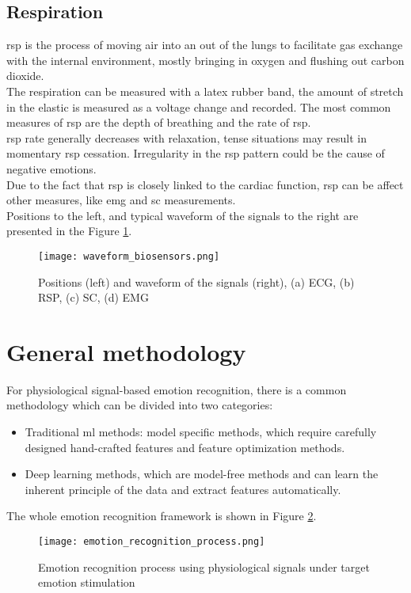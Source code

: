 \subsection{Respiration}
\gls{rsp} is the process of moving air into an out of the lungs to facilitate gas exchange with the internal environment, mostly bringing in oxygen and flushing out carbon dioxide.
\\
The respiration can be measured with a latex rubber band, the amount of stretch in the elastic is measured as a voltage change and recorded. The most common measures of \gls{rsp} are the depth of breathing and the rate of \gls{rsp}.
\\ \indent
\gls{rsp} rate generally decreases with relaxation, tense situations may result in momentary \gls{rsp} cessation. Irregularity in the \gls{rsp} pattern could be the cause of negative emotions.
\\
Due to the fact that \gls{rsp} is closely linked to the cardiac function, \gls{rsp} can be affect other measures, like \gls{emg} and \gls{sc} measurements.
\\
Positions to the left, and typical waveform of the signals to the right are presented in the Figure \ref{fig:waveform_biosensors}.
\begin{figure}[h]
    \centering
    \texttt{[image: waveform\_biosensors.png]} 
	\caption{Positions (left) and waveform of the signals (right), (a) ECG, (b) RSP, (c) SC, (d) EMG}
    \label{fig:waveform_biosensors}
\end{figure}

\section{General methodology}\label{general_methodology}
For physiological signal-based emotion recognition, there is a common methodology which can be divided into two categories:
\begin{itemize}
	\item Traditional \gls{ml} methods: model specific methods, which require carefully designed hand-crafted features and feature optimization methods.
	\item Deep learning methods, which are model-free methods and can learn the inherent principle of the data and extract features automatically.
\end{itemize}
The whole emotion recognition framework is shown in Figure \ref{fig:emotion_recognition_process}.
\begin{figure}[h]
    \centering
    \texttt{[image: emotion\_recognition\_process.png]} 
	\caption{Emotion recognition process using physiological signals under target emotion stimulation}
    \label{fig:emotion_recognition_process}
\end{figure}

